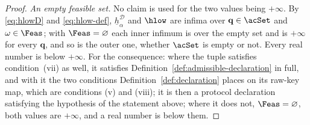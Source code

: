 \begin{proof}
\emph{An empty feasible set.} No claim is used for the two values being
$+\infty$. By
\eqref{eq:hlowD} and \eqref{eq:hlow-def}, $\underline{h}^{\mathcal{D}}_{\alpha}$
and $\hlow$ are infima over $\mathbf q\in\acSet$ and $\omega\in\Feas$; with
$\Feas=\varnothing$ each inner infimum is over the empty set and is $+\infty$
for every $\mathbf q$, and so is the outer one, whether $\acSet$ is empty or
not. Every real number is below $+\infty$. For the consequence: where the
tuple satisfies condition~(vii) as well, it satisfies
Definition~\ref{def:admissible-declaration} in full, and with it the two
conditions Definition~\ref{def:declaration} places on its raw-key map, which
are conditions (v) and (viii); it is then a protocol declaration satisfying
the hypothesis of the statement above; where it does not, $\Feas=\varnothing$, both values
are $+\infty$, and a real number is below them.
\end{proof}
